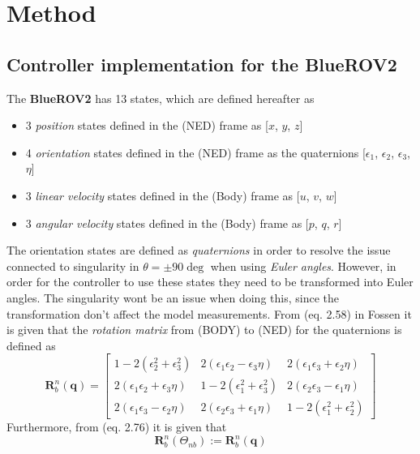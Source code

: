 \chapter{Method} \label{chap:method}
\section{Controller implementation for the BlueROV2}
The \textbf{BlueROV2} has 13 states, which are defined hereafter as
\begin{itemize}
    \item 3 \textit{position} states defined in the (NED) frame as [$x$, $y$, $z$]
    \item 4 \textit{orientation} states defined in the (NED) frame as the quaternions [$\epsilon_{1}$, $\epsilon_{2}$, $\epsilon_{3}$, $\eta$]
    \item 3 \textit{linear velocity} states defined in the (Body) frame as [$u$, $v$, $w$]
    \item 3 \textit{angular velocity} states defined in the (Body) frame as [$p$, $q$, $r$]
\end{itemize}
The orientation states are defined as \textit{quaternions} in order to resolve the issue connected to singularity in $\theta = \pm 90 \deg$ when using \textit{Euler angles}. However, in order for the controller to use these states they need to be transformed into Euler angles. The singularity wont be an issue when doing this, since the transformation don't affect the model measurements. From (eq. 2.58) in Fossen \cite{Fossen} it is given that the \textit{rotation matrix} from (BODY) to (NED) for the quaternions is defined as
\begin{equation}
    \mathbf{R}_{b}^{n}(\mathbf{q}) = 
    \begin{bmatrix}
    1 - 2(\epsilon_{2}^{2}+\epsilon_{3}^{2}) & 2(\epsilon_{1}\epsilon_{2}-\epsilon_{3}\eta) & 2(\epsilon_{1}\epsilon_{3}+\epsilon_{2}\eta) \\
    2(\epsilon_{1}\epsilon_{2}+\epsilon_{3}\eta) & 1 - 2(\epsilon_{1}^{2}+\epsilon_{3}^{2}) & 2(\epsilon_{2}\epsilon_{3}-\epsilon_{1}\eta) \\
    2(\epsilon_{1}\epsilon_{3}-\epsilon_{2}\eta) & 2(\epsilon_{2}\epsilon_{3}+\epsilon_{1}\eta) & 1 - 2(\epsilon_{1}^{2}+\epsilon_{2}^{2})
    \end{bmatrix}
\end{equation}
Furthermore, from (eq. 2.76) it is given that
\begin{equation}
    \mathbf{R}_{b}^{n}(\Theta_{nb}) := \mathbf{R}_{b}^{n}(\mathbf{q})
\end{equation}
